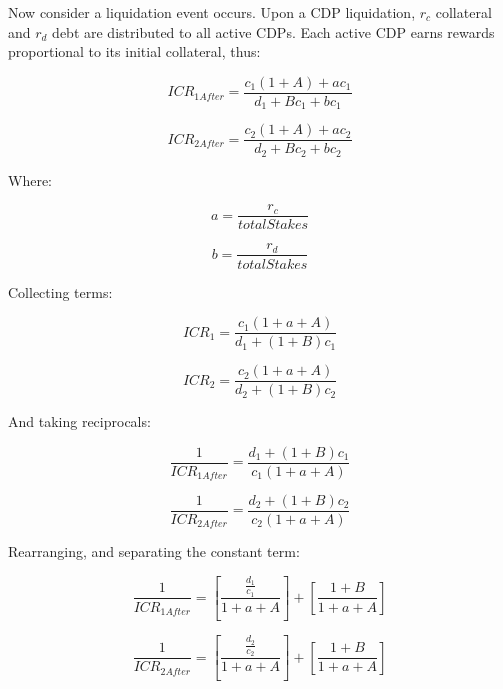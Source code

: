 \documentclass[reqno]{article}
\begin{document}
Now consider a liquidation event occurs. Upon a CDP liquidation, $r_c$ collateral and $r_d$ debt are distributed to all active CDPs. Each active CDP earns rewards proportional to its initial collateral, thus:

\begin{equation} 
    ICR_{1After}=\frac{c_1\left(1+A\right)+ac_1}{d_1+Bc_1+bc_1}
\end{equation}

\begin{equation} 
    ICR_{2After}=\frac{c_2\left(1+A\right)+ac_2}{d_2+Bc_2+bc_2}
\end{equation}

\bigskip
Where:

\begin{equation} 
    a=\frac{r_c}{totalStakes}
\end{equation}

\begin{equation} 
    b=\frac{r_d}{totalStakes}
\end{equation}

\bigskip
Collecting terms:

\begin{equation} 
    ICR_1=\frac{c_1\left(1+a+A\right)}{d_1+\left(1+B\right)c_1}
\end{equation}

\begin{equation} 
    ICR_2=\frac{c_2\left(1+a+A\right)}{d_2+\left(1+B\right)c_2}
\end{equation}

\bigskip
And taking reciprocals:

\begin{equation} 
    \frac{1}{ICR_{1After}}=\frac{d_1+\left(1+B\right)c_1}{c_1\left(1+a+A\right)}
\end{equation}

\begin{equation} 
    \frac{1}{ICR_{2After}}=\frac{d_2+\left(1+B\right)c_2}{c_2\left(1+a+A\right)}
\end{equation}

\bigskip
Rearranging, and separating the constant term:

\begin{equation} 
    \frac{1}{ICR_{1After}}=\left[\frac{\frac{d_1}{c_1}}{1+a+A}\right]+\left[\frac{1+B}{1+a+A}\right]
\end{equation}

\begin{equation} 
    \frac{1}{ICR_{2After}}=\left[\frac{\frac{d_2}{c_2}}{1+a+A}\right]+\left[\frac{1+B}{1+a+A}\right]
\end{equation}
\end{document}
